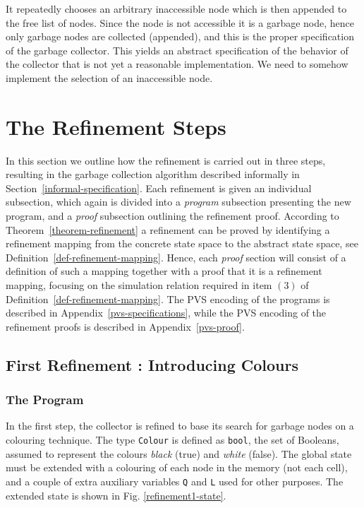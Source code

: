 It repeatedly chooses an arbitrary inaccessible node which  is 
then appended  to  the free list   of  nodes. Since   the  node is not
accessible it     is a garbage   node, hence   only garbage  nodes are
collected  (appended),  and this is the   proper  specification of the
garbage collector.  This yields an abstract specification of the behavior
of the collector that is not yet a reasonable implementation.
We need to somehow implement the selection of an inaccessible node.  


\section{The Refinement Steps}
\label{refinement-steps}

In this section we outline how the refinement  is carried out in three
steps,  resulting  in   the  garbage collection   algorithm  described
informally in Section~\ref{informal-specification}\@.  Each refinement is
given  an individual  subsection, which   again is  divided  into a  {\em
  program}  subsection  presenting  the new program,   and a  {\em proof}
subsection  outlining the  refinement  proof.  According  to
Theorem~\ref{theorem-refinement}  a refinement    can be   proved by
identifying a refinement mapping from the concrete  state space to the
abstract state  space,  see Definition~\ref{def-refinement-mapping}\@.  
Hence, each {\em proof} section will consist of a definition of such a
mapping together with a proof that it is a refinement mapping, focusing
on   the  simulation relation required in  item $(3)$ of
Definition~\ref{def-refinement-mapping}\@.  The   PVS encoding  of  the
programs is described in  Appendix~\ref{pvs-specifications}, while the PVS 
encoding of the refinement proofs is described in Appendix~\ref{pvs-proof}\@.


\subsection{First Refinement : Introducing Colours}
\label{first-refinement}

\subsubsection{The Program}

In  the first step, the  collector is refined  to base  its search for
garbage nodes  on a colouring  technique.  The  type {\tt  Colour}  is
defined as {\tt bool},  the set of  Booleans, assumed to represent the
colours {\em black}   (true) and {\em  white} (false)\@.    The global
state must be  extended with  a colouring  of each node  in the memory
(not each cell), and a couple of extra auxiliary variables {\tt Q} and
{\tt L} used for other purposes.  The extended state is shown in Fig. 
\ref{refinement1-state}.

